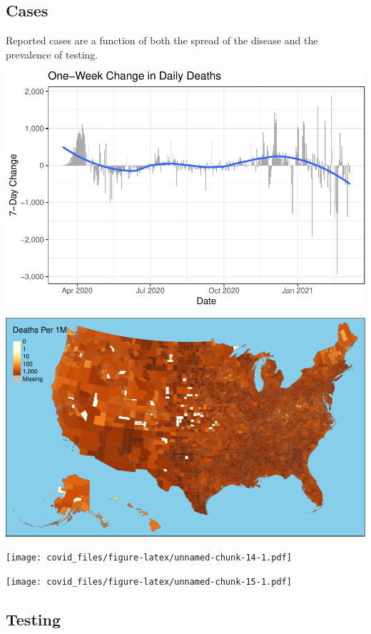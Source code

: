 \documentclass[]{article}
\begin{document}
\newpage

\hypertarget{cases}{%
\subsection{Cases}\label{cases}}

Reported cases are a function of both the spread of the disease and the
prevalence of testing.

\includegraphics{covid_files/figure-latex/unnamed-chunk-12-1.pdf}

\includegraphics{covid_files/figure-latex/unnamed-chunk-13-1.pdf}

\texttt{[image: covid\_files/figure-latex/unnamed-chunk-14-1.pdf]}

\texttt{[image: covid\_files/figure-latex/unnamed-chunk-15-1.pdf]}

\newpage

\hypertarget{testing}{%
\subsection{Testing}\label{testing}}
\end{document}
